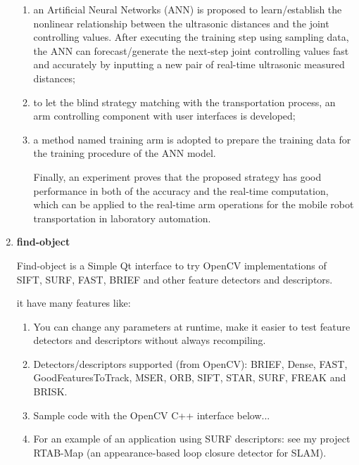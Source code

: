 \documentclass[10pt,twocolumn,letterpaper]{article}
\begin{document}
\begin{enumerate}
\begin{enumerate}
\item an Artificial Neural Networks (ANN) is proposed to learn/establish the nonlinear relationship between
the ultrasonic distances and the joint controlling values. After executing the training step using sampling data, the ANN can forecast/generate the next-step joint controlling values fast and
accurately by inputting a new pair of real-time ultrasonic measured distances; 

\item to let the blind strategy matching with the transportation process, an arm controlling component with
user interfaces is developed;

\item a method named training arm is adopted to prepare the training data for the training procedure of the ANN model.

Finally, an experiment proves that the proposed strategy has good performance in both of the accuracy and the real-time computation, which can be applied to the real-time arm operations for the mobile robot transportation in laboratory automation.

\end{enumerate}

\item \textbf{find-object}
 
Find-object is a Simple Qt interface to try OpenCV implementations of SIFT, SURF, FAST, BRIEF and other feature detectors and descriptors.

it have many features like:

\begin{enumerate}
\item You can change any parameters at runtime, make it easier to test feature detectors and descriptors without always recompiling.

\item Detectors/descriptors supported (from OpenCV): BRIEF, Dense, FAST, GoodFeaturesToTrack, MSER, ORB, SIFT, STAR, SURF, FREAK and BRISK.

\item Sample code with the OpenCV C++ interface below...

\item For an example of an application using SURF descriptors: see my project RTAB-Map (an appearance-based loop closure detector for SLAM).
\end{enumerate}

\end{enumerate}
\end{document}
